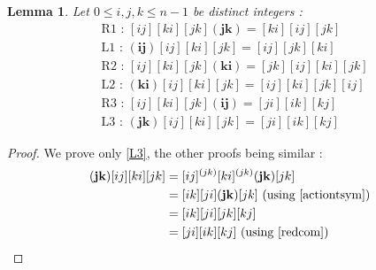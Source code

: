 \documentclass[a4paper,12pt,fleqn]{article}
\renewcommand\leq{\leqslant}
\newtheorem{prop}[theo]{Proposition}
\newtheorem{lem}[theo]{Lemma}
\begin{document}

  \begin{lem} \label{ijk} Let $0\leq i,j,k\leq n-1$ be distinct integers : 
    \begin{align}
      &\text{R1 : }[ij][ki][jk]\mathbf{(jk)} = [ki][ij][jk]\label{R1}\\
      &\text{L1 : } \mathbf{(ij)}[ij][ki][jk] = [ij][jk][ki]\label{L1}\\
      &\text{R2 : }[ij][ki][jk]\mathbf{(ki)} = [jk][ij][ki][jk]\label{R2}\\
      &\text{L2 : }\mathbf{(ki)}[ij][ki][jk] = [ij][ki][jk][ij]\label{L2}\\
      &\text{R3 : }[ij][ki][jk]\mathbf{(ij)} = [ji][ik][kj]\label{R3}\\
      &\text{L3 : }\mathbf{(jk)}[ij][ki][jk] = [ji][ik][kj]\label{L3}
    \end{align}
\end{lem}

\begin{proof}We prove only \eqref{L3}, the other proofs being similar :
  \begin{align*}
    \mathbf{(jk)}[ij][ki][jk]&=[ij]^{(jk)}[ki]^{(jk)}\mathbf{(jk)}[jk] \\
                             &=[ik][ji]\mathbf{(jk)}[jk] \text{ (using \eqref{actiontsym})}\\
                             &=[ik][ji][jk][kj] \\
                             &= [ji][ik][kj] \text{ (using \eqref{redcom})}
  \end{align*}
  \end{proof}
\end{document}
